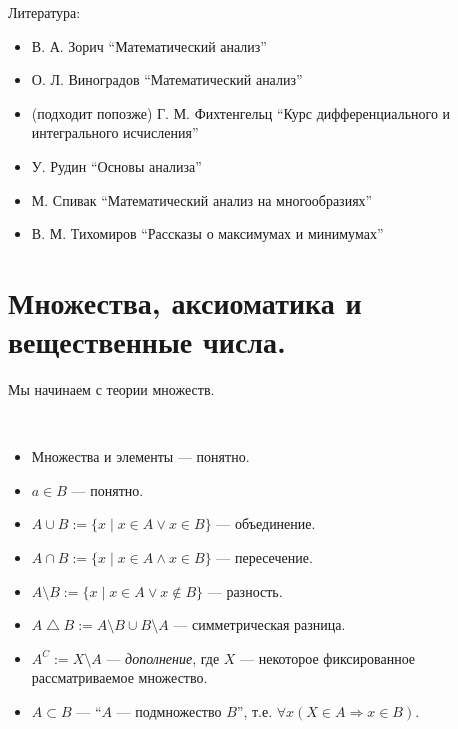 \documentclass[12pt,a4paper]{article}
\date{}
\begin{document}
    \maketitle

    \listoftodos[TODOs]

    \tableofcontents

    \vspace{2em}
    Литература:
    \begin{itemize}
        \item В. А. Зорич ``Математический анализ''
        \item О. Л. Виноградов ``Математический анализ''
        \item (подходит попозже) Г. М. Фихтенгельц ``Курс дифференциального и интегрального исчисления''
        \item У. Рудин ``Основы анализа''
        \item М. Спивак ``Математический анализ на многообразиях''
        \item В. М. Тихомиров ``Рассказы о максимумах и минимумах''
    \end{itemize}

    \section{Множества, аксиоматика и вещественные числа.}

    Мы начинаем с теории множеств.

    \begin{definition}\ 
        \begin{itemize}
            \item Множества и элементы --- понятно.
            \item $a \in B$ --- понятно.
            \item $A \cup B := \{x \mid x\in A \vee x\in B\}$ --- объединение.
            \item $A \cap B := \{x \mid x\in A \wedge x\in B\}$ --- пересечение.
            \item $A \setminus B := \{x \mid x\in A \vee x\notin B\}$ --- разность.
            \item $A \bigtriangleup B := A \setminus B \cup B \setminus A$ --- симметрическая разница.
            \item $A^C := X\setminus A$ --- \emph{дополнение}, где $X$ --- некоторое фиксированное рассматриваемое множество.
            \item $A \subset B$ --- ``$A$ --- подмножество $B$'', т.е. $\forall x (X\in A \Rightarrow x\in B)$.
        \end{itemize}
    \end{definition}
\end{document}
